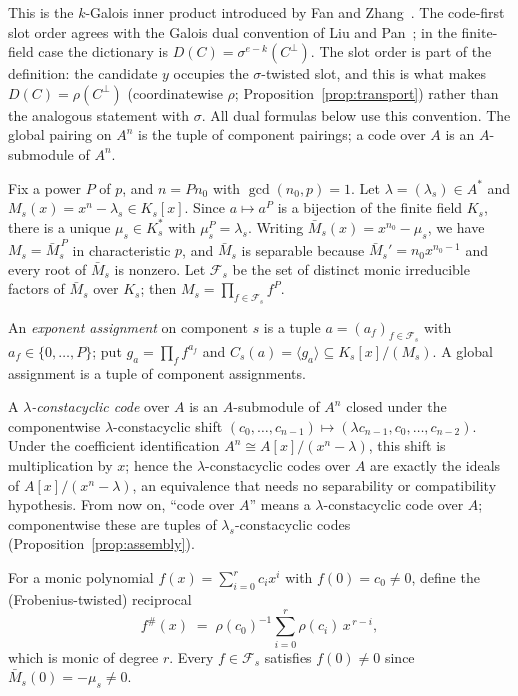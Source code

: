 \documentclass[10pt,journal,draftclsnofoot,onecolumn]{IEEEtran}
\theoremstyle{definition}
\theoremstyle{remark}
\begin{document}
This is the \(k\)-Galois inner product introduced by Fan and
Zhang~\cite{FZ2017}. The code-first slot order agrees with the Galois
dual convention of Liu and Pan~\cite{LP2020}; in the finite-field case
the dictionary is \(D(C) = \sigma^{e-k}(C^\perp)\). The slot order is part of the definition: the candidate \(y\) occupies
the \(\sigma\)-twisted slot, and this is what makes
\(D(C) = \rho(C^\perp)\) (coordinatewise \(\rho\);
Proposition~\ref{prop:transport}) rather than the analogous statement
with \(\sigma\). All dual formulas below use this convention. The global
pairing on \(A^n\) is the tuple of component pairings; a code over \(A\)
is an \(A\)-submodule of \(A^n\).

Fix a power \(P\) of \(p\), and \(n = P n_0\) with
\(\gcd(n_0, p) = 1\). Let \(\lambda = (\lambda_s) \in A^*\) and
\(M_s(x) = x^n - \lambda_s \in K_s[x]\). Since \(a \mapsto a^P\) is a
bijection of the finite field \(K_s\), there is a unique \(\mu_s \in K_s^*\)
with \(\mu_s^P = \lambda_s\). Writing \(\bar M_s(x) = x^{n_0} - \mu_s\), we
have \(M_s = \bar M_s^{\,P}\) in characteristic \(p\), and \(\bar M_s\) is
separable because \(\bar M_s' = n_0 x^{n_0-1}\) and every root of
\(\bar M_s\) is nonzero. Let \(\mathcal{F}_s\) be the set of distinct
monic irreducible factors of \(\bar M_s\) over \(K_s\); then
\(M_s = \prod_{f \in \mathcal{F}_s} f^P\).

An \emph{exponent assignment} on component \(s\) is a tuple
\(a = (a_f)_{f \in \mathcal{F}_s}\) with \(a_f \in \{0, \dots, P\}\); put
\(g_a = \prod_f f^{a_f}\) and \(C_s(a) = \langle g_a \rangle \subseteq
K_s[x]/(M_s)\). A global assignment is a tuple of component assignments.

A \emph{\(\lambda\)-constacyclic code} over \(A\) is an \(A\)-submodule of
\(A^n\) closed under the componentwise \(\lambda\)-constacyclic shift
\((c_0,\dots,c_{n-1}) \mapsto (\lambda c_{n-1}, c_0, \dots, c_{n-2})\).
Under the coefficient identification \(A^n \cong A[x]/(x^n-\lambda)\), this
shift is multiplication by \(x\); hence the \(\lambda\)-constacyclic codes
over \(A\) are exactly the ideals of \(A[x]/(x^n-\lambda)\), an equivalence
that needs no separability or compatibility hypothesis. From now on,
``code over \(A\)'' means a \(\lambda\)-constacyclic code over \(A\);
componentwise these are tuples of \(\lambda_s\)-constacyclic codes
(Proposition~\ref{prop:assembly}).

For a monic polynomial \(f(x) = \sum_{i=0}^{r} c_i x^i\) with
\(f(0) = c_0 \ne 0\), define the (Frobenius-twisted) reciprocal
\[
f^{\#}(x) \;=\; \rho(c_0)^{-1} \sum_{i=0}^{r} \rho(c_i)\, x^{\,r-i},
\]
which is monic of degree \(r\). Every \(f \in \mathcal{F}_s\) satisfies
\(f(0) \ne 0\) since \(\bar M_s(0) = -\mu_s \ne 0\).
\end{document}
